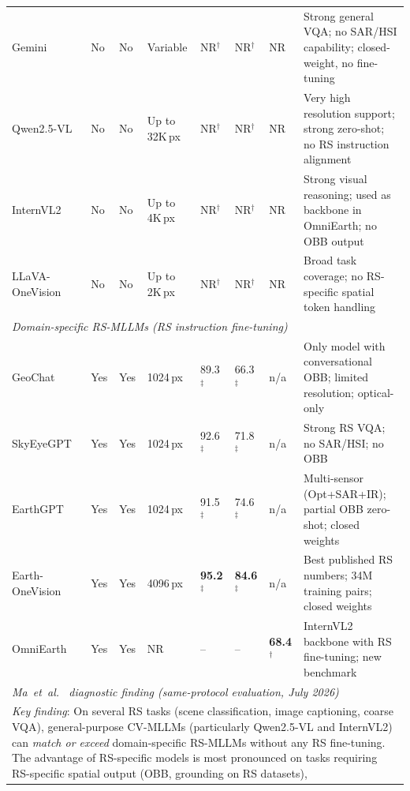 \begin{table}[t]
\begin{tabular*}{\textwidth}{@{\extracolsep\fill}p{2.2cm}p{0.9cm}p{0.9cm}p{0.9cm}p{1.4cm}p{1.4cm}p{1.3cm}p{3.0cm}}
Gemini~\cite{gemini2023}
  & No & No & Variable
  & NR$^\dagger$ & NR$^\dagger$ & NR
  & Strong general VQA; no SAR/HSI capability; closed-weight, no fine-tuning \\
Qwen2.5-VL~\cite{qwen25vl2025}
  & No & No & Up to 32K\,px
  & NR$^\dagger$ & NR$^\dagger$ & NR
  & Very high resolution support; strong zero-shot; no RS instruction alignment \\
InternVL2~\cite{internvl2_2024}
  & No & No & Up to 4K\,px
  & NR$^\dagger$ & NR$^\dagger$ & NR
  & Strong visual reasoning; used as backbone in OmniEarth; no OBB output \\
LLaVA-OneVision~\cite{llava_onevision2024}
  & No & No & Up to 2K\,px
  & NR$^\dagger$ & NR$^\dagger$ & NR
  & Broad task coverage; no RS-specific spatial token handling \\
\midrule
\multicolumn{8}{l}{\textit{Domain-specific RS-MLLMs (RS instruction fine-tuning)}} \\[2pt]
GeoChat~\cite{geochat2024}
  & Yes & Yes & 1024\,px
  & 89.3$^\ddagger$ & 66.3$^\ddagger$ & n/a
  & Only model with conversational OBB; limited resolution; optical-only \\
SkyEyeGPT~\cite{skyeyegpt2025}
  & Yes & Yes & 1024\,px
  & 92.6$^\ddagger$ & 71.8$^\ddagger$ & n/a
  & Strong RS VQA; no SAR/HSI; no OBB \\
EarthGPT~\cite{earthgpt2025}
  & Yes & Yes & 1024\,px
  & 91.5$^\ddagger$ & 74.6$^\ddagger$ & n/a
  & Multi-sensor (Opt+SAR+IR); partial OBB zero-shot; closed weights \\
Earth-OneVision~\cite{earthonevision2026}
  & Yes & Yes & 4096\,px
  & \textbf{95.2}$^\ddagger$ & \textbf{84.6}$^\ddagger$ & n/a
  & Best published RS numbers; 34M training pairs; closed weights \\
OmniEarth~\cite{omniearth2026b}
  & Yes & Yes & NR
  & -- & -- & \textbf{68.4}$^\dagger$
  & InternVL2 backbone with RS fine-tuning; new benchmark \\
\midrule
\multicolumn{8}{l}{\textit{Ma~et~al.~\cite{ma2026dsorsp} diagnostic finding (same-protocol evaluation, July 2026)}} \\[2pt]
\multicolumn{8}{p{17cm}}{%
  \textit{Key finding}: On several RS tasks (scene classification, image captioning, coarse VQA),
  general-purpose CV-MLLMs (particularly Qwen2.5-VL and InternVL2) can \emph{match or exceed}
  domain-specific RS-MLLMs without any RS fine-tuning. The advantage of RS-specific models is
  most pronounced on tasks requiring RS-specific spatial output (OBB, grounding on RS datasets),
}
\end{tabular*}
\end{table}
